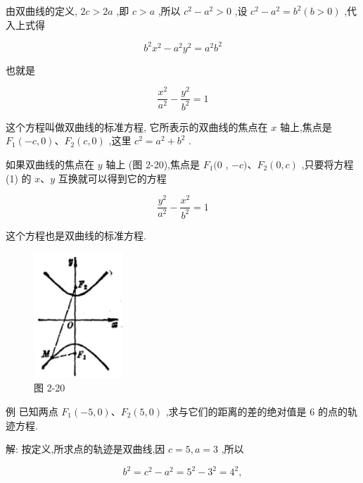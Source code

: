 \documentclass[lang=cn,newtx,10pt,scheme=chinese]{elegantbook}
\begin{document}
由双曲线的定义, \({2c} > {2a}\) ,即 \(c > a\) ,所以 \({c}^{2} - {a}^{2} > 0\) ,设 \({c}^{2} - {a}^{2} = {b}^{2}\left( {b > 0}\right)\) ,代入上式得

\[
    {b}^{2}{x}^{2} - {a}^{2}{y}^{2} = {a}^{2}{b}^{2}
\]

也就是
\begin{definition}[双曲线的标准方程] 
\[
  \frac{{x}^{2}}{{a}^{2}} - \frac{{y}^{2}}{{b}^{2}} = 1 \tag{1}
\]

这个方程叫做双曲线的标准方程, 它所表示的双曲线的焦点在 \(x\) 轴上,焦点是 \({F}_{1}\left( {-c,0}\right) \text{、}{F}_{2}\left( {c,0}\right)\) ,这里 \({c}^{2} = {a}^{2} + {b}^{2}\) .
\end{definition}

\begin{corollary}[双曲线标准方程2]
	

如果双曲线的焦点在 \(y\) 轴上 (图 2-20),焦点是 \({F}_{1}(0\) , \(- c)\text{、}{F}_{2}\left( {0,c}\right)\) ,只要将方程 (1) 的 \(x\text{、}y\) 互换就可以得到它的方程

\[
  \frac{{y}^{2}}{{a}^{2}} - \frac{{x}^{2}}{{b}^{2}} = 1
\]

这个方程也是双曲线的标准方程.

\end{corollary}
\begin{figure}[h]
  \centering
  \includegraphics[max width=0.3\textwidth]{images/01912cc2-ffb6-728e-9ae7-b113ff05c64b_98_269004.jpg}
  \caption{图 2-20}
\end{figure}





例 已知两点 \({F}_{1}\left( {-5,0}\right) \text{、}{F}_{2}\left( {5,0}\right)\) ,求与它们的距离的差的绝对值是 6 的点的轨迹方程.

解: 按定义,所求点的轨迹是双曲线,因 \(c = 5,a = 3\) ,所以

\[
    {b}^{2} = {c}^{2} - {a}^{2} = {5}^{2} - {3}^{2} = {4}^{2},
\]
\end{document}
